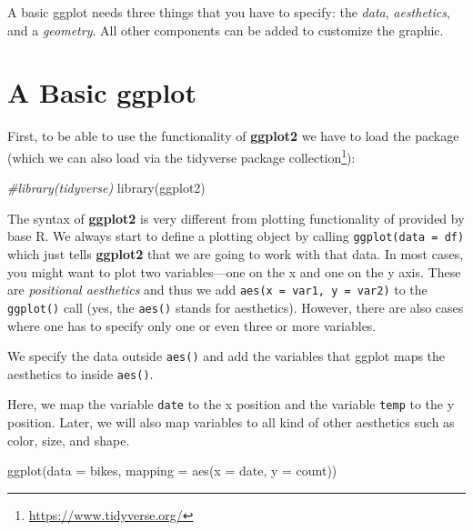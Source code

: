 \documentclass[
]{krantz}
\makeatletter
\newenvironment{Shaded}{\begin{snugshade}}{\end{snugshade}}
\newcommand{\AttributeTok}[1]{\textcolor[rgb]{0.61,0.61,0.61}{#1}}
\newcommand{\CommentTok}[1]{\textcolor[rgb]{0.37,0.37,0.37}{\textit{#1}}}
\newcommand{\FunctionTok}[1]{\textcolor[rgb]{0,0,0}{#1}}
\newcommand{\NormalTok}[1]{#1}
\renewcommand{\href}[2]{#2\footnote{\url{#1}}}
\newenvironment{kframe}{%
\medskip{}
\setlength{\fboxsep}{.8em}
 \def\at@end@of@kframe{}%
 \ifinner\ifhmode%
  \def\at@end@of@kframe{\end{minipage}}%
  \begin{minipage}{\columnwidth}%
 \fi\fi%
 \def\FrameCommand##1{\hskip\@totalleftmargin \hskip-\fboxsep
 \colorbox{shadecolor}{##1}\hskip-\fboxsep
     \hskip-\linewidth \hskip-\@totalleftmargin \hskip\columnwidth}%
 \MakeFramed {\advance\hsize-\width
   \@totalleftmargin\z@ \linewidth\hsize
   \@setminipage}}%
 {\par\unskip\endMakeFramed%
 \at@end@of@kframe}
\renewenvironment{Shaded}{\begin{kframe}}{\end{kframe}}
\makeatother
\begin{document}
A basic ggplot needs three things that you have to specify: the \emph{data}, \emph{aesthetics}, and a \emph{geometry}. All other components can be added to customize the graphic.

\hypertarget{default}{%
\section{A Basic ggplot}\label{default}}

First, to be able to use the functionality of \textbf{ggplot2} we have to load the package (which we can also load via the \href{https://www.tidyverse.org/}{tidyverse package collection}):

\begin{Shaded}
\begin{Highlighting}[]
\CommentTok{\#library(tidyverse)}
\FunctionTok{library}\NormalTok{(ggplot2)}
\end{Highlighting}
\end{Shaded}

The syntax of \textbf{ggplot2} is very different from plotting functionality of provided by base R. We always start to define a plotting object by calling \texttt{ggplot(data\ =\ df)} which just tells \textbf{ggplot2} that we are going to work with that data. In most cases, you might want to plot two variables---one on the x and one on the y axis. These are \emph{positional aesthetics} and thus we add \texttt{aes(x\ =\ var1,\ y\ =\ var2)} to the \texttt{ggplot()} call (yes, the \texttt{aes()} stands for aesthetics). However, there are also cases where one has to specify only one or even three or more variables.

We specify the data outside \texttt{aes()} and add the variables that ggplot maps the aesthetics to inside \texttt{aes()}.

Here, we map the variable \texttt{date} to the x position and the variable \texttt{temp} to the y position. Later, we will also map variables to all kind of other aesthetics such as color, size, and shape.

\begin{Shaded}
\begin{Highlighting}[]
\FunctionTok{ggplot}\NormalTok{(}\AttributeTok{data =}\NormalTok{ bikes, }\AttributeTok{mapping =} \FunctionTok{aes}\NormalTok{(}\AttributeTok{x =}\NormalTok{ date, }\AttributeTok{y =}\NormalTok{ count))}
\end{Highlighting}
\end{Shaded}
\end{document}
